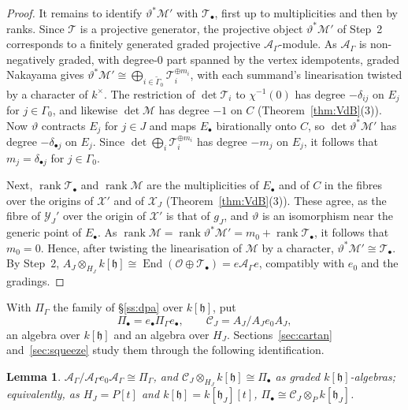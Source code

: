 \documentclass[11pt]{amsart}
\makeatletter
\numberwithin{table}{section}
\numberwithin{figure}{section}
\numberwithin{equation}{section}
\newtheorem{lem}[thm]{Lemma}
\theoremstyle{definition}
\theoremstyle{plain}
\newcommand{\cC}{\mathcal{C}}
\newcommand{\cA}{\mathcal{A}}
\newcommand{\cO}{\mathcal{O}}
\newcommand{\cX}{\mathcal{X}}
\newcommand{\cY}{\mathcal{Y}}
\newcommand{\h}{\mathfrak{h}}
\newcommand{\bul}{\bullet}
\newcommand{\tGamma}{\widetilde{\Gamma}}
\DeclareMathOperator{\End}{End}
\DeclareMathOperator{\rank}{rank}
\renewcommand\paragraph{\@startsection{paragraph}{4}{\z@}{\medskipamount}{-.5em}{\normalfont\bfseries}}
\makeatother
\begin{document}
\begin{proof}
It remains to identify $\vartheta^*\mathcal M'$ with $\mathcal T_\bul$, first up to multiplicities and then by ranks. Since $\mathcal T$ is a projective generator, the projective object $\vartheta^*\mathcal M'$ of Step~2 corresponds to a finitely generated graded projective $\cA_\Gamma$-module. As $\cA_\Gamma$ is non-negatively graded, with degree-$0$ part spanned by the vertex idempotents, graded Nakayama gives $\vartheta^*\mathcal M' \cong \bigoplus_{i \in \tGamma_0} \mathcal T_i^{\oplus m_i}$, with each summand's linearisation twisted by a character of $k^\times$. The restriction of $\det \mathcal T_i$ to $\chi^{-1}(0)$ has degree $-\delta_{ij}$ on $E_j$ for $j \in \Gamma_0$, and likewise $\det \mathcal M$ has degree $-1$ on $C$ (Theorem~\ref{thm:VdB}(3)). Now $\vartheta$ contracts $E_j$ for $j \in J$ and maps $E_\bul$ birationally onto $C$, so $\det \vartheta^*\mathcal M'$ has degree $-\delta_{\bul j}$ on $E_j$. Since $\det \bigoplus_i \mathcal T_i^{\oplus m_i}$ has degree $-m_j$ on $E_j$, it follows that $m_j = \delta_{\bul j}$ for $j \in \Gamma_0$.

Next, $\rank \mathcal T_\bul$ and $\rank \mathcal M$ are the multiplicities of $E_\bul$ and of $C$ in the fibres over the origins of $\cX'$ and of $\cX_J$ (Theorem~\ref{thm:VdB}(3)). These agree, as the fibre of $\cY_J'$ over the origin of $\cX'$ is that of $g_J$, and $\vartheta$ is an isomorphism near the generic point of $E_\bul$. As $\rank \mathcal M = \rank \vartheta^*\mathcal M' = m_0 + \rank \mathcal T_\bul$, it follows that $m_0 = 0$. Hence, after twisting the linearisation of $\mathcal M$ by a character, $\vartheta^*\mathcal M' \cong \mathcal T_\bul$. By Step~2, $A_J \otimes_{H_J} k[\h] \cong \End(\cO \oplus \mathcal T_\bul) = e\cA_\Gamma e$, compatibly with $e_0$ and the gradings.
\end{proof}

\paragraph{The corner.} With $\Pi_\Gamma$ the family of \S\ref{ss:dpa} over $k[\h]$, put
\[
\Pi_\bul = e_\bul\Pi_\Gamma e_\bul, \qquad \cC_J = A_J / A_J e_0 A_J ,
\]
an algebra over $k[\h]$ and an algebra over $H_J$. Sections~\ref{sec:cartan} and~\ref{sec:squeeze} study them through the following identification.

\begin{lem}\label{lem:corner}
$\cA_\Gamma/\cA_\Gamma e_0\cA_\Gamma \cong \Pi_\Gamma$, and $\cC_J \otimes_{H_J} k[\h] \cong \Pi_\bul$ as graded $k[\h]$-algebras; equivalently, as $H_J = P[t]$ and $k[\h] = k[\h_J][t]$, $\Pi_\bul \cong \cC_J \otimes_P k[\h_J]$.
\end{lem}
\end{document}
